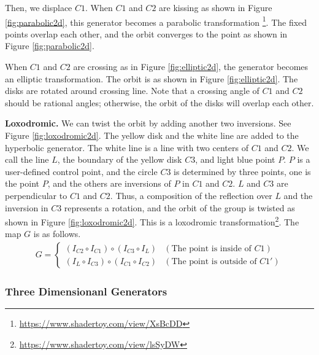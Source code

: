  Then, we displace $C1$.
 When $C1$ and $C2$ are kissing as shown in Figure 
 \ref{fig:parabolic2d},
 this generator becomes a parabolic transformation
 \footnote{\url{https://www.shadertoy.com/view/XsBcDD}}.
 The fixed points overlap each other, and the orbit converges to the
 point as shown in Figure \ref{fig:parabolic2d}.

 When $C1$ and $C2$ are crossing as in Figure \ref{fig:elliptic2d},
 the generator becomes an elliptic transformation.
 The orbit is as shown in Figure \ref{fig:elliptic2d}.
 The disks are rotated around crossing line.
 Note that a crossing angle of $C1$ and $C2$ should be rational angles;
 otherwise, the orbit of the disks will overlap each other.

\noindent\textbf{Loxodromic.}
 We can twist the orbit by adding another two inversions.
 See Figure \ref{fig:loxodromic2d}.
 The yellow disk and the white line are added to the hyperbolic generator.
 The white line is a line with two centers of $C1$ and $C2$.
 We call the line $L$, the boundary of the yellow disk $C3$, and
 light blue point $P$.
 $P$ is a user-defined control point, and the circle $C3$ is determined
 by three points, one is the point $P$, and the others are inversions
 of $P$ in $C1$ and $C2$.
 $L$ and $C3$ are perpendicular to $C1$ and $C2$.
 Thus, a composition of the reflection over $L$ and the inversion in $C3$
 represents a rotation, and
 the orbit of the group is twisted as shown in Figure
 \ref{fig:loxodromic2d}. This is a loxodromic
 transformation\footnote{\url{https://www.shadertoy.com/view/lsSyDW}}.
 The map $G$ is as follows.
 \begin{align*}
  G =
  \begin{cases}
   (I_{C2} \circ I_{C1}) \circ (I_{C3} \circ I_L) & (\text{The point is inside of } C1) \\
   (I_L \circ I_{C3}) \circ (I_{C1} \circ I_{C2}) & (\text{The point is outside of }C1')
  \end{cases}
 \end{align*}

\subsubsection{Three Dimensionanl Generators}

